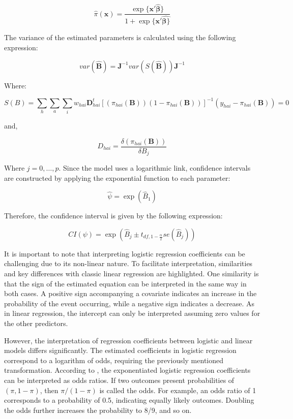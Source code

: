 \documentclass[
  12pt,
]{book}
\begin{document}
\[
\hat{\pi}(\textbf{x})= \frac{\exp\{\textbf{x}'\hat{\boldsymbol{\beta}}\}}{1+\exp\{\textbf{x}'\hat{\boldsymbol{\beta}\}}}
\]

The variance of the estimated parameters is calculated using the following expression:

\[
var\left(\boldsymbol{\hat{B}}\right)=\boldsymbol{J}^{-1}var\left(S\left(\hat{\boldsymbol{B}}\right)\right)\boldsymbol{J}^{-1}
\]

Where:

\[
S\left(B\right)=\sum_{h}\sum_{a}\sum_{i}w_{hai}\boldsymbol{D}_{hai}^{t}\left[\left(\pi_{hai}\left(\boldsymbol{B}\right)\right)\left(1-\pi_{hai}\left(\boldsymbol{B}\right)\right)\right]^{-1}\left(y_{hai}-\pi_{hai}\left(\boldsymbol{B}\right)\right)=0
\]

and,

\[
D_{hai} = \frac{\delta\left(\pi_{hai}\left(\boldsymbol{B}\right)\right)}{\delta B_{j}}
\]

Where \(j=0,\dots,p\). Since the model uses a logarithmic link, confidence intervals are constructed by applying the exponential function to each parameter:

\[
\hat{\psi}=\exp\left(\hat{B}_{1}\right)
\]

Therefore, the confidence interval is given by the following expression:

\[
CI\left(\psi\right)=\exp\left(\hat{B}_{j}\pm t_{df,1-\frac{\alpha}{2}}se\left(\hat{B}_{j}\right)\right)
\]

It is important to note that interpreting logistic regression coefficients can be challenging due to its non-linear nature. To facilitate interpretation, similarities and key differences with classic linear regression are highlighted. One similarity is that the sign of the estimated equation can be interpreted in the same way in both cases. A positive sign accompanying a covariate indicates an increase in the probability of the event occurring, while a negative sign indicates a decrease. As in linear regression, the intercept can only be interpreted assuming zero values for the other predictors.

However, the interpretation of regression coefficients between logistic and linear models differs significantly. The estimated coefficients in logistic regression correspond to a logarithm of odds, requiring the previously mentioned transformation. According to \citet{gelmanhill2019}, the exponentiated logistic regression coefficients can be interpreted as odds ratios. If two outcomes present probabilities of \((\pi,1-\pi)\), then \(\pi/(1-\pi)\) is called the odds. For example, an odds ratio of 1 corresponds to a probability of 0.5, indicating equally likely outcomes. Doubling the odds further increases the probability to 8/9, and so on.
\end{document}
